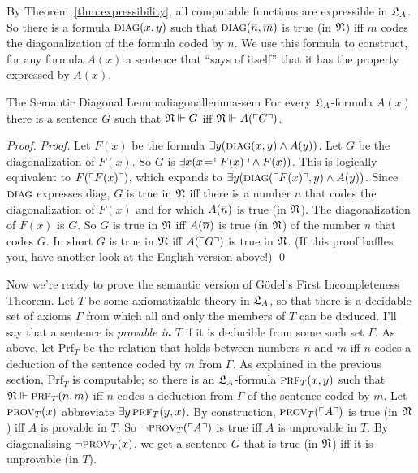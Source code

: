 By Theorem~\ref{thm:expressibility},
all computable functions are expressible in $\mathfrak{L}_A$.
So there is a formula $\smallcaps{diag}(x,y)$
such that $\smallcaps{diag}(\num{n},\num{m})$ is true (in $\mathfrak{N}$) iff
$m$ codes the diagonalization of the formula coded by $n$.
We use this formula to construct,
for any formula $A(x)$ a sentence that ``says of itself'' that it has the property expressed by $A(x)$.

\begin{lemma}{The Semantic Diagonal Lemma}{diagonallemma-sem}
  For every $\mathfrak{L}_A$-formula $A(x)$ there is a sentence $G$
  such that $\mathfrak{N} \Vdash G$ iff $\mathfrak{N} \Vdash A(\ulcorner G \urcorner)$.
\end{lemma}
\begin{proof}
  \emph{Proof.}
  Let $F(x)$ be the formula $\exists y(\smallcaps{diag}(x,y) \land A(y))$.
  Let $G$ be the diagonalization of $F(x)$.
  So $G$ is $\exists x(x\!=\!\ulcorner F(x) \urcorner \land F(x))$.
  This is logically equivalent to $F(\ulcorner F(x) \urcorner)$,
  which expands to $\exists y(\smallcaps{diag}(\gn{F(x)},y) \land A(y))$.
  Since $\smallcaps{diag}$ expresses $\mathrm{diag}$,
  $G$ is true in $\mathfrak{N}$ iff
  there is a number $n$ that codes the diagonalization of $F(x)$ and for which
  $A(\overline{n})$ is true (in $\mathfrak{N}$).
  The diagonalization of $F(x)$ is $G$.
  So $G$ is true in $\mathfrak{N}$ iff
  $A(\overline{n})$ is true (in $\mathfrak{N}$) of the number $n$ that codes $G$.
  In short $G$ is true in $\mathfrak{N}$ iff $A(\ulcorner G \urcorner)$ is true in $\mathfrak{N}$.
  (If this proof baffles you,
  have another look at the English version above!)
  \qed
\end{proof}
\noindent%

Now we're ready to prove the semantic version of Gödel's First Incompleteness Theorem.
Let $T$ be some axiomatizable theory in $\mathfrak{L}_A$,
so that 
there is a decidable set of axioms $\Gamma$ from which all and only the members of $T$ can be deduced.
I'll say that a sentence is \emph{provable in $T$} if it is deducible from some such set $\Gamma$.
As above,
let $\mathrm{Prf}_T$ be the relation that holds between numbers $n$ and $m$
iff $n$ codes a deduction of the sentence coded by $m$ from $\Gamma$.
As explained in the previous section,
$\mathrm{Prf}_T$ is computable;
so there is an $\mathfrak{L}_A$-formula $\smallcaps{Prf}_T(x,y)$ such that
$\Mod{N} \satisfies \smallcaps{Prf}_T(\num{n},\num{m})$ iff
$n$ codes a deduction from $\Gamma$ of the sentence coded by $m$.
Let $\smallcaps{Prov}_T(x)$ abbreviate $\exists y \, \smallcaps{Prf}_T(y,x)$.
By construction,
$\smallcaps{Prov}_T(\gn{A})$ is true (in $\mathfrak{N}$) iff $A$ is provable in $T$.
So $\neg \smallcaps{Prov}_T(\gn{A})$ is true iff $A$ is unprovable in $T$.
By diagonalising $\neg \smallcaps{Prov}_T(x)$,
we get a sentence $G$ that is true (in $\mathfrak{N}$) iff it is unprovable (in $T$).

